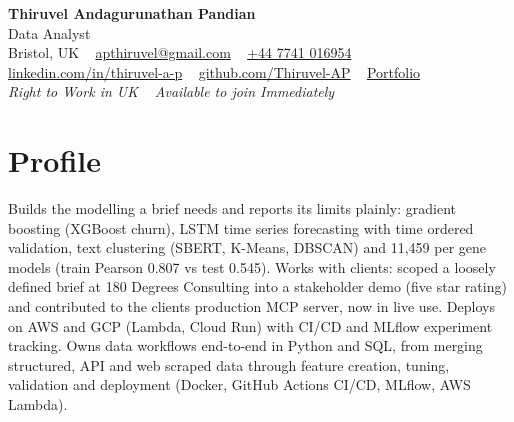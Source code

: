 \documentclass[a4paper,11pt]{article}
\begin{document}
\begin{center}
  {\fontsize{22}{26}\selectfont\bfseries\color{navy} Thiruvel Andagurunathan Pandian}\\[4pt]
  {\fontsize{12}{14}\selectfont\color{navy} Data Analyst}\\[4pt]
  {\small
  Bristol, UK\nobreak\ \,\textperiodcentered\, \href{mailto:apthiruvel@gmail.com}{apthiruvel@gmail.com}\nobreak\ \,\textperiodcentered\, \href{tel:+447741016954}{+44 7741 016954}\nobreak\ \,\textperiodcentered\, \href{https://www.linkedin.com/in/thiruvel-a-p/}{linkedin.com/in/thiruvel-a-p}\nobreak\ \,\textperiodcentered\, \href{https://github.com/Thiruvel-AP}{github.com/Thiruvel-AP}\nobreak\ \,\textperiodcentered\, \href{https://thiruvel-ap.github.io/PersonalPortfolio/}{Portfolio}}\\[3pt]
  {\small\itshape\color{muted} Right to Work in UK\nobreak\ \,\textperiodcentered\, Available to join Immediately}

\end{center}

\section{Profile}
Builds the modelling a brief needs and reports its limits plainly: gradient boosting (XGBoost churn), LSTM time series forecasting with time ordered validation, text clustering (SBERT, K-Means, DBSCAN) and 11,459 per gene models (train Pearson 0.807 vs test 0.545). Works with clients: scoped a loosely defined brief at 180 Degrees Consulting into a stakeholder demo (five star rating) and contributed to the client\textquotesingle{}s production MCP server, now in live use. Deploys on AWS and GCP (Lambda, Cloud Run) with CI/CD and MLflow experiment tracking. Owns data workflows end-to-end in Python and SQL, from merging structured, API and web scraped data through feature creation, tuning, validation and deployment (Docker, GitHub Actions CI/CD, MLflow, AWS Lambda).
\end{document}
